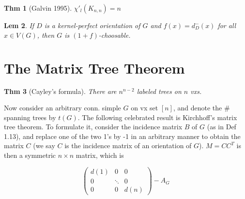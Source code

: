 \documentclass[11pt, fleqn, a4paper, landscape]{article}
\theoremstyle{plain} %
\newtheorem{thm}{Thm}
\newtheorem{lem}[thm]{Lem}
\theoremstyle{remark} %
\theoremstyle{definition} %
\newtheorem{defi}[thm]{Def}
\begin{document}
\begin{multicols}{5}
\addtocounter{thm}{2}
\begin{thm}[Galvin 1995]
$\chi'_l(K_{n,n}) = n$
\end{thm}

\addtocounter{thm}{1}
\begin{lem}
If $D$ is a kernel-perfect orientation of $G$ and $f(x) = d^-_D(x)$ for all $x \in V (G)$, then $G$ is $(1 + f)$-choosable.
\end{lem}

\section{The Matrix Tree Theorem}

\begin{thm}[Cayley's formula]
There are $n^{n-2}$ labeled trees on $n$ vxs.
\end{thm}

Now consider an arbitrary conn. simple $G$ on vx set $[n]$, and denote the \# spanning trees by $t(G)$. The following celebrated result is Kirchhoff’s matrix tree theorem. To formulate it, consider the incidence matrix $B$ of $G$ (as in Def 1.13), and replace one of the
two 1’s by -1 in an arbitrary manner to obtain the matrix $C$ (we say $C$ is the incidence matrix of an orientation of $G$). $ M = CC^T$ is then a symmetric $n \times n$ matrix, which is 

\[
\begin{pmatrix}
d(1) & 0 & 0  \\
0 & \ddots & 0  \\
0 & 0 & d(n)  
\end{pmatrix}-A_G\]


\end{multicols}
\end{document}

